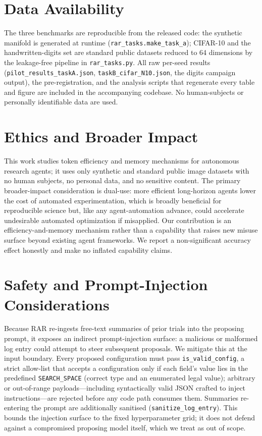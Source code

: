 \documentclass[conference]{IEEEtran}
\begin{document}
\section*{Data Availability}
The three benchmarks are reproducible from the released code: the synthetic manifold is generated at runtime (\texttt{rar\_tasks.make\_task\_a}); CIFAR-10 and the handwritten-digits set are standard public datasets reduced to 64 dimensions by the leakage-free pipeline in \texttt{rar\_tasks.py}. All raw per-seed results (\texttt{pilot\_results\_taskA.json}, \texttt{taskB\_cifar\_N10.json}, the digits campaign output), the pre-registration, and the analysis scripts that regenerate every table and figure are included in the accompanying codebase. No human-subjects or personally identifiable data are used.

\section*{Ethics and Broader Impact}
This work studies token efficiency and memory mechanisms for autonomous research agents; it uses only synthetic and standard public image datasets with no human subjects, no personal data, and no sensitive content. The primary broader-impact consideration is dual-use: more efficient long-horizon agents lower the cost of automated experimentation, which is broadly beneficial for reproducible science but, like any agent-automation advance, could accelerate undesirable automated optimization if misapplied. Our contribution is an efficiency-and-memory mechanism rather than a capability that raises new misuse surface beyond existing agent frameworks. We report a non-significant accuracy effect honestly and make no inflated capability claims.

\section*{Safety and Prompt-Injection Considerations}
Because RAR re-ingests free-text summaries of prior trials into the proposing prompt, it exposes an indirect prompt-injection surface: a malicious or malformed log entry could attempt to steer subsequent proposals. We mitigate this at the input boundary. Every proposed configuration must pass \texttt{is\_valid\_config}, a strict allow-list that accepts a configuration only if each field's value lies in the predefined \texttt{SEARCH\_SPACE} (correct type and an enumerated legal value); arbitrary or out-of-range payloads---including syntactically valid JSON crafted to inject instructions---are rejected before any code path consumes them. Summaries re-entering the prompt are additionally sanitised (\texttt{sanitize\_log\_entry}). This bounds the injection surface to the fixed hyperparameter grid; it does not defend against a compromised proposing model itself, which we treat as out of scope.
\end{document}
